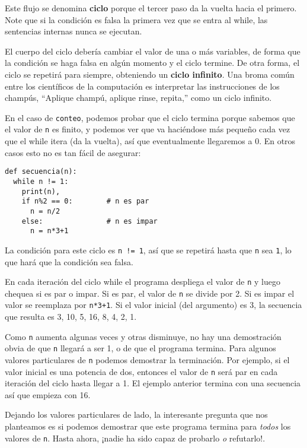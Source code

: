 Este flujo se denomina \textbf{ciclo} porque el tercer paso da la
vuelta hacia el primero. Note que si la condición es falsa la primera
vez que se entra al while, las sentencias internas nunca se ejecutan.

   
 

El cuerpo del ciclo debería cambiar el valor de una o más variables,
de forma que la condición se haga falsa en algún momento y el ciclo
termine. De otra forma, el ciclo se repetirá para siempre, obteniendo
un \textbf{ciclo infinito}. Una broma común entre los científicos
de la computación es interpretar las instrucciones de los champús,
``Aplique champú, aplique rinse, repita,'' como un ciclo infinito.

En el caso de \texttt{conteo}, podemos probar que el ciclo termina
porque sabemos que el valor de \texttt{n} es finito, y podemos ver
que va haciéndose más pequeño cada vez que el while itera (da la vuelta),
así que eventualmente llegaremos a 0. En otros casos esto no es tan
fácil de asegurar:

\begin{lstlisting}
def secuencia(n):
  while n != 1:
    print(n),
    if n%2 == 0:        # n es par
      n = n/2
    else:               # n es impar
      n = n*3+1
\end{lstlisting}
 La condición para este ciclo es \texttt{n != 1}, así que se repetirá
hasta que \texttt{n} sea \texttt{1}, lo que hará que la condición
sea falsa.

En cada iteración del ciclo while el programa despliega el valor de
\texttt{n} y luego chequea si es par o impar. Si es par, el valor
de \texttt{n} se divide por 2. Si es impar el valor se reemplaza por
\texttt{n{*}3+1}. Si el valor inicial (del argumento) es 3, la secuencia
que resulta es 3, 10, 5, 16, 8, 4, 2, 1.

Como \texttt{n} aumenta algunas veces y otras disminuye, no hay una
demostración obvia de que \texttt{n} llegará a ser 1, o de que el
programa termina. Para algunos valores particulares de \texttt{n}
podemos demostrar la terminación. Por ejemplo, si el valor inicial
es una potencia de dos, entonces el valor de \texttt{n} será par en
cada iteración del ciclo hasta llegar a 1. El ejemplo anterior termina
con una secuencia así que empieza con 16.

Dejando los valores particulares de lado, la interesante pregunta
que nos planteamos es si podemos demostrar que este programa termina
para {\em todos} los valores de \texttt{n}. Hasta ahora, ¡nadie
ha sido capaz de probarlo {\em o} refutarlo!.

